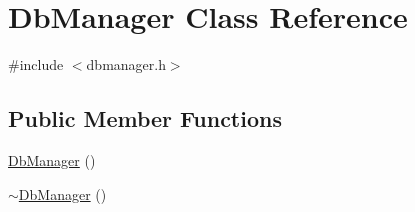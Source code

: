\hypertarget{class_db_manager}{}\section{Db\+Manager Class Reference}
\label{class_db_manager}


{\ttfamily \#include $<$dbmanager.\+h$>$}

\subsection*{Public Member Functions}
\begin{DoxyCompactItemize}
\item 
\hyperlink{class_db_manager_a0d16cf5bba931362e6c581eb1b5ba66a}{Db\+Manager} ()
\item 
\hyperlink{class_db_manager_ac5cdf8e5e932d1681ab807d8f256374c}{$\sim$\+Db\+Manager} ()
\end{DoxyCompactItemize}
